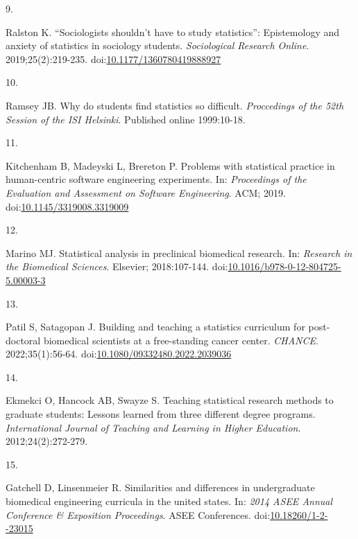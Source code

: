 \documentclass[smallextended]{svjour3}       %
\newlength{\cslhangindent}
\newlength{\csllabelwidth}
\newlength{\cslentryspacingunit} %
\newenvironment{CSLReferences}[2] %
 {%
  \setlength{\parindent}{0pt}
  \ifodd #1
  \let\oldpar\par
  \def\par{\hangindent=\cslhangindent\oldpar}
  \fi
  \setlength{\parskip}{#2\cslentryspacingunit}
 }%
 {}
\newcommand{\CSLLeftMargin}[1]{\parbox[t]{\csllabelwidth}{#1}}
\newcommand{\CSLRightInline}[1]{\parbox[t]{\linewidth - \csllabelwidth}{#1}\break}
\begin{document}
\begin{CSLReferences}{0}{0}
\leavevmode{}%
\CSLLeftMargin{9. }%
\CSLRightInline{Ralston K. {``Sociologists shouldn't have to study
statistics''}: Epistemology and anxiety of statistics in sociology
students. \emph{Sociological Research Online}. 2019;25(2):219-235.
doi:\href{https://doi.org/10.1177/1360780419888927}{10.1177/1360780419888927}}

\leavevmode{}%
\CSLLeftMargin{10. }%
\CSLRightInline{Ramsey JB. Why do students find statistics so difficult.
\emph{Proccedings of the 52th Session of the ISI Helsinki}. Published
online 1999:10-18.}

\leavevmode{}%
\CSLLeftMargin{11. }%
\CSLRightInline{Kitchenham B, Madeyski L, Brereton P. Problems with
statistical practice in human-centric software engineering experiments.
In: \emph{Proceedings of the Evaluation and Assessment on Software
Engineering}. {ACM}; 2019.
doi:\href{https://doi.org/10.1145/3319008.3319009}{10.1145/3319008.3319009}}

\leavevmode{}%
\CSLLeftMargin{12. }%
\CSLRightInline{Marino MJ. Statistical analysis in preclinical
biomedical research. In: \emph{Research in the Biomedical Sciences}.
Elsevier; 2018:107-144.
doi:\href{https://doi.org/10.1016/b978-0-12-804725-5.00003-3}{10.1016/b978-0-12-804725-5.00003-3}}

\leavevmode{}%
\CSLLeftMargin{13. }%
\CSLRightInline{Patil S, Satagopan J. Building and teaching a statistics
curriculum for post-doctoral biomedical scientists at a free-standing
cancer center. \emph{{CHANCE}}. 2022;35(1):56-64.
doi:\href{https://doi.org/10.1080/09332480.2022.2039036}{10.1080/09332480.2022.2039036}}

\leavevmode{}%
\CSLLeftMargin{14. }%
\CSLRightInline{Ekmekci O, Hancock AB, Swayze S. Teaching statistical
research methods to graduate students: Lessons learned from three
different degree programs. \emph{International Journal of Teaching and
Learning in Higher Education}. 2012;24(2):272-279.}

\leavevmode{}%
\CSLLeftMargin{15. }%
\CSLRightInline{Gatchell D, Linsenmeier R. Similarities and differences
in undergraduate biomedical engineering curricula in the united states.
In: \emph{2014 {ASEE} Annual Conference {\&} Exposition Proceedings}.
{ASEE} Conferences.
doi:\href{https://doi.org/10.18260/1-2--23015}{10.18260/1-2-\/-23015}}


\end{CSLReferences}
\end{document}
